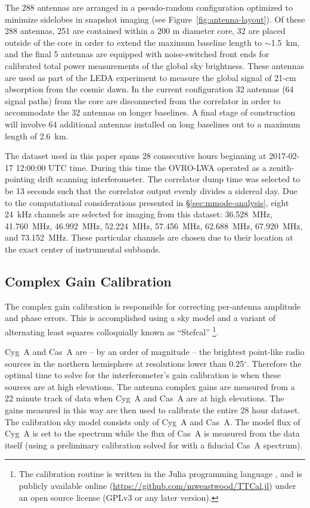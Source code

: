 \documentclass[twocolumn]{aastex61}
\begin{document}
The 288 antennas are arranged in a pseudo-random configuration optimized to minimize sidelobes in
snapshot imaging (see Figure~\ref{fig:antenna-layout}).  Of these 288 antennas, 251 are contained
within a 200 m diameter core, 32 are placed outside of the core in order to extend the maximum
baseline length to $\sim$1.5~km, and the final 5 antennas are equipped with noise-switched front
ends for calibrated total power measurements of the global sky brightness.  These antennas are used
as part of the LEDA experiment \citep{2017arXiv170909313P} to measure the global signal of 21-cm
absorption from the cosmic dawn. In the current configuration 32 antennas (64 signal paths) from the
core are disconnected from the correlator in order to accommodate the 32 antennas on longer
baselines. A final stage of construction will involve 64 additional antennas installed on long
baselines out to a maximum length of 2.6~km.

The dataset used in this paper spans 28 consecutive hours beginning at 2017-02-17 12:00:00 UTC time.
During this time the OVRO-LWA operated as a zenith-pointing drift scanning interferometer.  The
correlator dump time was selected to be 13 seconds such that the correlator output evenly divides a
sidereal day. Due to the computational considerations presented in \S\ref{sec:mmode-analysis}, eight
24~kHz channels are selected for imaging from this dataset: 36.528~MHz, 41.760~MHz, 46.992~MHz,
52.224~MHz, 57.456~MHz, 62.688~MHz, 67.920~MHz, and 73.152~MHz.  These particular channels are
chosen due to their location at the exact center of instrumental subbands.

\subsection{Complex Gain Calibration}\label{sec:gaincal}

The complex gain calibration is responsible for correcting per-antenna amplitude and phase errors.
This is accomplished using a sky model and a variant of alternating least squares colloquially known
as ``Stefcal''
\citep{2008ISTSP...2..707M, 2014A&A...571A..97S}\footnote{
    The calibration routine is written in the Julia programming language
    \citep{doi:10.1137/141000671}, and is publicly available online
    (\url{https://github.com/mweastwood/TTCal.jl}) under an open source license (GPLv3 or any later
    version).
}.

Cyg~A and Cas~A are -- by an order of magnitude -- the brightest point-like radio sources in the
northern hemisphere at resolutions lower than 0.25$^\circ$. Therefore the optimal time to solve for
the interferometer's gain calibration is when these sources are at high elevations.  The antenna
complex gains are measured from a 22 minute track of data when Cyg~A and Cas~A are at high
elevations. The gains measured in this way are then used to calibrate the entire 28 hour dataset.
The calibration sky model consists only of Cyg~A and Cas~A. The model flux of Cyg~A is set to the
\citet{1977A&A....61...99B} spectrum while the flux of Cas~A is measured from the data itself (using
a preliminary calibration solved for with a fiducial Cas~A spectrum).
\end{document}
